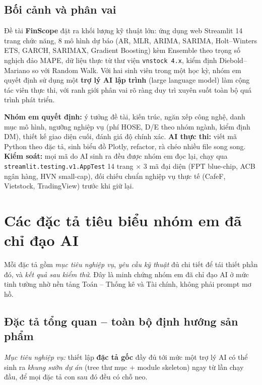 \documentclass[12pt,a4paper]{article}
\begin{document}
\subsection{Bối cảnh và phân vai}

\indent Đề tài \textbf{FinScope} đặt ra khối lượng kỹ thuật lớn: ứng dụng web Streamlit 14 trang chức năng, 8 mô hình dự báo (AR, MLR, ARIMA, SARIMA, Holt--Winters ETS, GARCH, SARIMAX, Gradient Boosting) kèm Ensemble theo trọng số nghịch đảo MAPE, dữ liệu thực từ thư viện \texttt{vnstock 4.x}, kiểm định Diebold--Mariano so với Random Walk. Với hai sinh viên trong một học kỳ, nhóm em quyết định sử dụng một \textbf{trợ lý AI lập trình} (large language model) làm cộng tác viên thực thi, với ranh giới phân vai rõ ràng duy trì xuyên suốt toàn bộ quá trình phát triển.

\textbf{Nhóm em quyết định:} ý tưởng đề tài, kiến trúc, ngăn xếp công nghệ, danh mục mô hình, ngưỡng nghiệp vụ (phí HOSE, D/E theo nhóm ngành, kiểm định DM), thiết kế giao diện cuối, đánh giá độ chính xác. \textbf{AI thực thi:} viết mã Python theo đặc tả, sinh biểu đồ Plotly, refactor, rà chéo nhiều file song song. \textbf{Kiểm soát:} mọi mã do AI sinh ra đều được nhóm em đọc lại, chạy qua \texttt{streamlit.testing.v1.AppTest} 14 trang $\times$ 3 mã đại diện (FPT blue-chip, ACB ngân hàng, HVN small-cap), đối chiếu chuẩn nghiệp vụ thực tế (CafeF, Vietstock, TradingView) trước khi giữ lại.

\section{Các đặc tả tiêu biểu nhóm em đã chỉ đạo AI}

\indent Mỗi đặc tả gồm \emph{mục tiêu nghiệp vụ}, \emph{yêu cầu kỹ thuật} đủ chi tiết để tái thiết phần đó, và \emph{kết quả sau kiểm thử}. Đây là minh chứng nhóm em đã chỉ đạo AI ở mức tinh tường nhờ nền tảng Toán -- Thống kê và Tài chính, không phải prompt mơ hồ.

\subsection{Đặc tả tổng quan -- toàn bộ định hướng sản phẩm}

\textit{Mục tiêu nghiệp vụ:} thiết lập \textbf{đặc tả gốc} đầy đủ tới mức một trợ lý AI có thể sinh ra \emph{khung sườn dự án} (tree thư mục + module skeleton) ngay từ lần chạy đầu, để mọi đặc tả con sau đó đều có chỗ neo.
\end{document}
